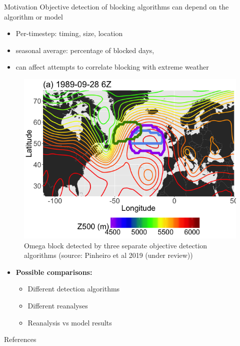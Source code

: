 \documentclass[final]{beamer}
\newlength{\onecolwid}
\begin{document}
\begin{frame}[t]
\begin{columns}[t]
\begin{column}{\onecolwid}
\begin{alertblock}{Motivation}
Objective detection of blocking algorithms can depend on the algorithm or model
\begin{itemize}
    \item Per-timestep: timing, size, location
    \item seasonal average: percentage of blocked days, 
    \item can affect attempts to correlate blocking with extreme weather
\end{itemize}
\begin{figure}
    \centering
    \includegraphics[width=\textwidth]{fig8a.png}
    \caption{Omega block detected by three separate objective detection algorithms (source: Pinheiro et al 2019 (under review))}
    \label{fig:block_compare}
\end{figure}
\vspace{-1.5em}
    \begin{itemize}
        \item \textbf{Possible comparisons:}
        \begin{itemize}
            \item Different detection algorithms
            \item Different reanalyses
            \item Reanalysis vs model results
        \end{itemize}
    \end{itemize}

\end{alertblock}
\begin{block}{References}


\end{block}
\end{column}
\end{columns}
\end{frame}
\end{document}
